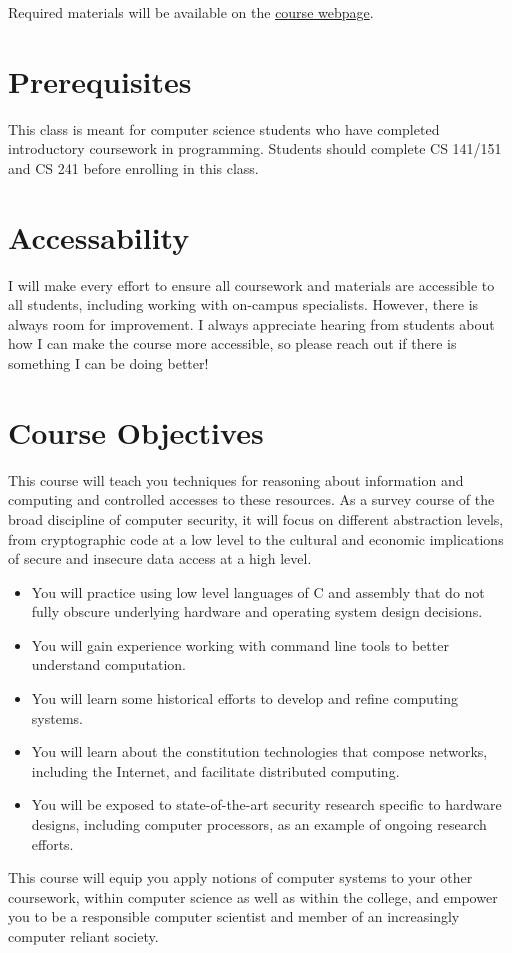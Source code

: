 \documentclass[11pt]{article}
\begin{document}
Required materials will be available on the \href{https://cd-public.github.io/courses/computer_security/399s22.html}{course webpage}.



\section*{Prerequisites}

This class is meant for computer science students who have completed introductory coursework in programming.  Students should complete CS 141/151 and CS 241 before enrolling in this class.

\section*{Accessability}

I will make every effort to ensure all coursework and materials are accessible to all students, including working with on-campus specialists. However, there is always room for improvement. I always appreciate hearing from students about how I can make the course more accessible, so please reach out if there is something I can be doing better!


\section*{Course Objectives}
This course will teach you techniques for reasoning about information and computing and controlled accesses to these resources. As a survey course of the broad discipline of computer security, it will focus on different abstraction levels, from cryptographic code at a low level to the cultural and economic implications of secure and insecure data access at a high level.
\begin{itemize}
\item You will practice using low level languages of C and assembly that do not fully obscure underlying hardware and operating system design decisions.
\item You will gain experience working with command line tools to better understand computation.
\item You will learn some historical efforts to develop and refine computing systems.
\item You will learn about the constitution technologies that compose networks, including the Internet, and facilitate distributed computing.
\item You will be exposed to state-of-the-art security research specific to hardware designs, including computer processors, as an example of ongoing research efforts.
\end{itemize}
This course will equip you apply notions of computer systems to your other coursework, within computer science as well as within the college, and empower you to be a responsible computer scientist and member of an increasingly computer reliant society.
\end{document}
